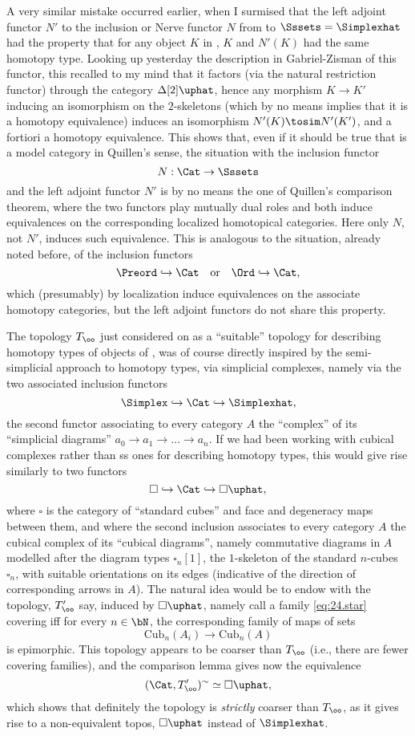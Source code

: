 A very similar mistake occurred earlier, when I surmised that the left
adjoint functor $N'$ to the inclusion or Nerve functor $N$ from \Cat{}
to $\Sssets = \Simplexhat$ had the property that for any object
$K$ in \Sssets, $K$ and $N'(K)$ had the same homotopy type. Looking
up yesterday the description in Gabriel-Zisman of this functor, this
recalled to my mind that it factors (via the natural restriction
functor) through the category ${\Delta[2]}\uphat$, hence any
morphism $K \to K'$ inducing an isomorphism on the $2$-skeletons
(which by no means implies that it is a homotopy equivalence) induces
an isomorphism $N'(K) \tosim N'(K')$, and a fortiori a
homotopy equivalence. This shows that, even if it should be true that
\Cat{} is a model category in Quillen's sense, the
situation with the inclusion functor
\[ N : \Cat \to \Sssets \]
and the left adjoint functor $N'$ is by no means the one of Quillen's
comparison theorem, where the two functors play mutually dual roles
and both induce equivalences on the corresponding localized
homotopical categories. Here only $N$, not $N'$, induces such
equivalence. This is analogous to the situation, already noted before,
of the inclusion functors
\[ \Preord \hookrightarrow \Cat
\quad\text{or}\quad
\Ord \hookrightarrow \Cat,\]
which (presumably) by localization induce equivalences on the associate homotopy
categories, but the left adjoint functors do not share this property.

The topology $T_\oo$ just considered on \Cat{} as a ``suitable''
topology for describing homotopy types of objects of \Cat{}, was of
course directly inspired by the semi-simplicial approach to homotopy
types, via simplicial complexes, namely via the two associated
inclusion functors
\[ \Simplex \hookrightarrow \Cat \hookrightarrow
\Simplexhat,\]
the second functor associating to every category $A$ the ``complex''
of its ``simplicial diagrams'' $a_0 \to a_1 \to \dots \to a_n$. If we
had been working with cubical complexes rather than ss ones for
describing homotopy types, this would give rise similarly to two
functors
\[ \square \hookrightarrow \Cat \hookrightarrow
\square\uphat,\]
where $\square$ is the category of ``standard cubes'' and face and
degeneracy maps between them, and where the second inclusion
associates to every category $A$ the cubical complex of its ``cubical
diagrams'', namely commutative diagrams in $A$ modelled after the
diagram types $\square_n[1]$, the $1$-skeleton of the standard
$n$-cubes $\square_n$, with suitable orientations on its edges
(indicative of the direction of corresponding arrows in $A$). The
natural idea would be to endow \Cat{} with the topology, $T_\oo'$ say,
induced by $\square\uphat$, namely call a family \eqref{eq:24.star}
covering if{f} for every $n\in\bN$, the corresponding family of maps
of sets
\[ \text{Cub}_n(A_i) \to \text{Cub}_n(A)\]
is epimorphic. This topology appears to be coarser than $T_\oo$ (i.e.,
there are fewer covering families), and the comparison lemma gives now
the equivalence
\[ (\Cat,T_\oo')^\sim \simeq \square\uphat,\]
which shows that definitely the topology is \emph{strictly} coarser
than $T_\oo$, as it gives rise to a non-equivalent topos,
$\square\uphat$ instead of $\Simplexhat$.

